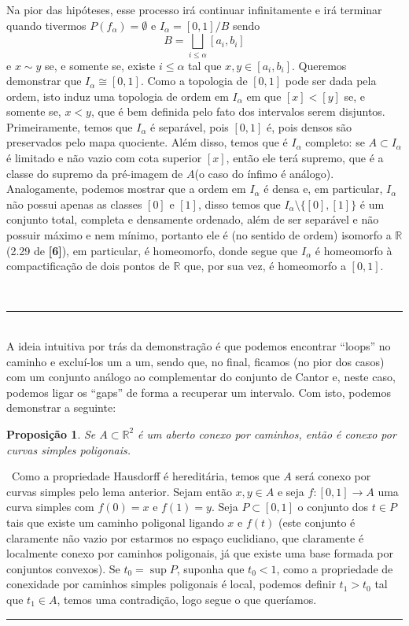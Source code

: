 \documentclass[12pt,a4paper]{article}
\newtheorem{prop}[mydef]{Proposição}
\def\dem{\par\smallbreak\noindent {\textit{ Demonstração:}} \ }
\def\eop{\hfill\rule{2.5mm}{2.5mm} \\ }
\theoremstyle{definition}
\begin{document}
Na pior das hipóteses, esse processo irá continuar infinitamente e irá terminar quando tivermos $P(f_\alpha)=\emptyset$ e $I_\alpha = [0,1]/B$ sendo $$B=\bigsqcup_{i\leq \alpha} [a_i,b_i]$$ e $x\sim y$ se, e somente se, existe $i\leq \alpha$ tal que $x,y\in [a_i,b_i]$. Queremos demonstrar que $I_\alpha \cong [0,1]$. Como a topologia de $[0,1]$ pode ser dada pela ordem, isto induz uma topologia de ordem em $I_\alpha$ em que $[x]<[y]$ se, e somente se, $x<y$, que é bem definida pelo fato dos intervalos serem disjuntos. Primeiramente, temos que $I_\alpha$ é separável, pois $[0,1]$ é, pois densos são preservados pelo mapa quociente. Além disso, temos que é $I_\alpha$ completo: se $A\subset I_\alpha$ é limitado e não vazio com cota superior $[x]$, então ele terá supremo, que é a classe do supremo da pré-imagem de $A$(o caso do ínfimo é análogo). Analogamente, podemos mostrar que a ordem em $I_\alpha$ é densa e, em particular, $I_\alpha$ não possui apenas as classes $[0]$ e $[1]$, disso temos que $I_\alpha\setminus \{[0],[1]\}$ é um conjunto total, completa e densamente ordenado, além de ser separável e não possuir máximo e nem mínimo, portanto ele é (no sentido de ordem) isomorfo a $\mathbb{R}$ (2.29 de \textbf{[6]}), em particular, é homeomorfo, donde segue que $I_\alpha$ é homeomorfo à compactificação de dois pontos de $\mathbb{R}$ que, por sua vez, é homeomorfo a $[0,1]$. 

\ \eop

A ideia intuitiva por trás da demonstração é que podemos encontrar ``loops'' no caminho e excluí-los um a um, sendo que, no final, ficamos (no pior dos casos) com um conjunto análogo ao complementar do conjunto de Cantor e, neste caso, podemos ligar os ``gaps'' de forma a recuperar um intervalo. Com isto, podemos demonstrar a seguinte: 

\begin{prop}

    Se $A\subset \mathbb{R}^2$ é um aberto conexo por caminhos, então é conexo por curvas simples poligonais.

\end{prop}

\dem Como a propriedade Hausdorff é hereditária, temos que $A$ será conexo por curvas simples pelo lema anterior. Sejam então $x,y\in A$ e seja $f:[0,1]\rightarrow A$ uma curva simples com $f(0)=x$ e $f(1)=y$. Seja $P\subset [0,1]$ o conjunto dos $t\in P$ tais que existe um caminho poligonal ligando $x$ e $f(t)$ (este conjunto é claramente não vazio por estarmos no espaço euclidiano, que claramente é localmente conexo por caminhos poligonais, já que existe uma base formada por conjuntos convexos). Se $t_0 = \sup P$, suponha que $t_0<1$, como a propriedade de conexidade por caminhos simples poligonais é local, podemos definir $t_1>t_0$ tal que $t_1\in A$, temos uma contradição, logo segue o que queríamos. \eop
\end{document}
